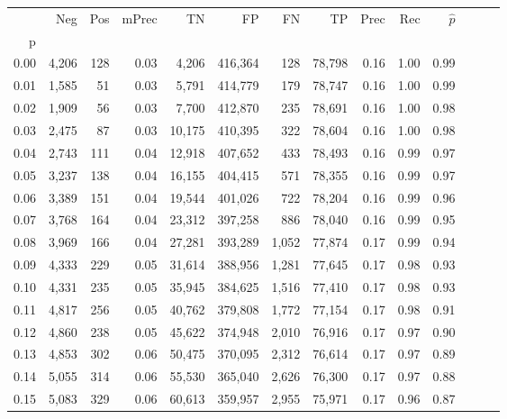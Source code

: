\begin{tabular}{rrrrrrrrrrrrrr}
\toprule
{} &    Neg &    Pos & mPrec &       TN &       FP &      FN &      TP &  Prec &   Rec & $\hat{p}$ \\
p    &        &        &       &          &          &         &         &       &       &           \\
\midrule
0.00 &  4,206 &    128 &  0.03 &    4,206 &  416,364 &     128 &  78,798 &  0.16 &  1.00 &      0.99 \\
0.01 &  1,585 &     51 &  0.03 &    5,791 &  414,779 &     179 &  78,747 &  0.16 &  1.00 &      0.99 \\
0.02 &  1,909 &     56 &  0.03 &    7,700 &  412,870 &     235 &  78,691 &  0.16 &  1.00 &      0.98 \\
0.03 &  2,475 &     87 &  0.03 &   10,175 &  410,395 &     322 &  78,604 &  0.16 &  1.00 &      0.98 \\
0.04 &  2,743 &    111 &  0.04 &   12,918 &  407,652 &     433 &  78,493 &  0.16 &  0.99 &      0.97 \\
0.05 &  3,237 &    138 &  0.04 &   16,155 &  404,415 &     571 &  78,355 &  0.16 &  0.99 &      0.97 \\
0.06 &  3,389 &    151 &  0.04 &   19,544 &  401,026 &     722 &  78,204 &  0.16 &  0.99 &      0.96 \\
0.07 &  3,768 &    164 &  0.04 &   23,312 &  397,258 &     886 &  78,040 &  0.16 &  0.99 &      0.95 \\
0.08 &  3,969 &    166 &  0.04 &   27,281 &  393,289 &   1,052 &  77,874 &  0.17 &  0.99 &      0.94 \\
0.09 &  4,333 &    229 &  0.05 &   31,614 &  388,956 &   1,281 &  77,645 &  0.17 &  0.98 &      0.93 \\
0.10 &  4,331 &    235 &  0.05 &   35,945 &  384,625 &   1,516 &  77,410 &  0.17 &  0.98 &      0.93 \\
0.11 &  4,817 &    256 &  0.05 &   40,762 &  379,808 &   1,772 &  77,154 &  0.17 &  0.98 &      0.91 \\
0.12 &  4,860 &    238 &  0.05 &   45,622 &  374,948 &   2,010 &  76,916 &  0.17 &  0.97 &      0.90 \\
0.13 &  4,853 &    302 &  0.06 &   50,475 &  370,095 &   2,312 &  76,614 &  0.17 &  0.97 &      0.89 \\
0.14 &  5,055 &    314 &  0.06 &   55,530 &  365,040 &   2,626 &  76,300 &  0.17 &  0.97 &      0.88 \\
0.15 &  5,083 &    329 &  0.06 &   60,613 &  359,957 &   2,955 &  75,971 &  0.17 &  0.96 &      0.87 \\

\end{tabular}
